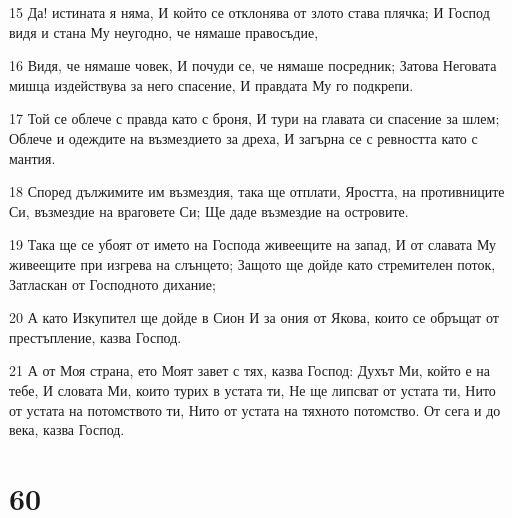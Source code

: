 \par 15 Да! истината я няма, И който се отклонява от злото става плячка; И Господ видя и стана Му неугодно, че нямаше правосъдие,
\par 16 Видя, че нямаше човек, И почуди се, че нямаше посредник; Затова Неговата мишца издействува за него спасение, И правдата Му го подкрепи.
\par 17 Той се облече с правда като с броня, И тури на главата си спасение за шлем; Облече и одеждите на възмездието за дреха, И загърна се с ревността като с мантия.
\par 18 Според дължимите им възмездия, така ще отплати, Яростта, на противниците Си, възмездие на враговете Си; Ще даде възмездие на островите.
\par 19 Така ще се убоят от името на Господа живеещите на запад, И от славата Му живеещите при изгрева на слънцето; Защото ще дойде като стремителен поток, Затласкан от Господното дихание;
\par 20 А като Изкупител ще дойде в Сион И за ония от Якова, които се обръщат от престъпление, казва Господ.
\par 21 А от Моя страна, ето Моят завет с тях, казва Господ: Духът Ми, който е на тебе, И словата Ми, които турих в устата ти, Не ще липсват от устата ти, Нито от устата на потомството ти, Нито от устата на тяхното потомство. От сега и до века, казва Господ.

\chapter{60}


